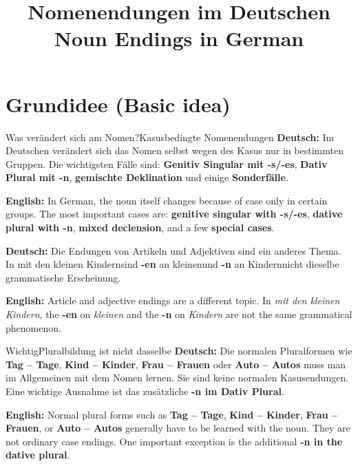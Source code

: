 \documentclass[a4paper,11pt]{article}
\title{Nomenendungen im Deutschen\\\large \textnormal{Noun Endings in German}}
\date{}
\newcommand{\GermanText}[1]{\textbf{Deutsch: }#1\par}
\newcommand{\EnglishText}[1]{{\small\color{SoftGray}\textbf{English: }#1\par}}
\begin{document}
\maketitle
\tableofcontents
\newpage

\section{Grundidee \textnormal{(Basic idea)}}
\begin{grammarentry}{Was verändert sich am Nomen?}{Kasusbedingte Nomenendungen}
\GermanText{Im Deutschen verändert sich das Nomen selbst wegen des Kasus nur in bestimmten Gruppen. Die wichtigsten Fälle sind: \textbf{Genitiv Singular mit -s/-es}, \textbf{Dativ Plural mit -n}, \textbf{gemischte Deklination} und einige \textbf{Sonderfälle}.}
\EnglishText{In German, the noun itself changes because of case only in certain groups. The most important cases are: \textbf{genitive singular with -s/-es}, \textbf{dative plural with -n}, \textbf{mixed declension}, and a few \textbf{special cases}.}

\GermanText{Die Endungen von Artikeln und Adjektiven sind ein anderes Thema. In \glqq mit den kleinen Kindern\grqq sind \textbf{-en} an \glqq kleinen\grqq und \textbf{-n} an \glqq Kindern\grqq nicht dieselbe grammatische Erscheinung.}
\EnglishText{Article and adjective endings are a different topic. In \emph{mit den kleinen Kindern}, the \textbf{-en} on \emph{kleinen} and the \textbf{-n} on \emph{Kindern} are not the same grammatical phenomenon.}
\end{grammarentry}

\begin{grammarentry}{Wichtig}{Pluralbildung ist nicht dasselbe}
\GermanText{Die normalen Pluralformen wie \textbf{Tag -- Tage}, \textbf{Kind -- Kinder}, \textbf{Frau -- Frauen} oder \textbf{Auto -- Autos} muss man im Allgemeinen mit dem Nomen lernen. Sie sind keine normalen Kasusendungen. Eine wichtige Ausnahme ist das zusätzliche \textbf{-n im Dativ Plural}.}
\EnglishText{Normal plural forms such as \textbf{Tag -- Tage}, \textbf{Kind -- Kinder}, \textbf{Frau -- Frauen}, or \textbf{Auto -- Autos} generally have to be learned with the noun. They are not ordinary case endings. One important exception is the additional \textbf{-n in the dative plural}.}
\end{grammarentry}
\end{document}

